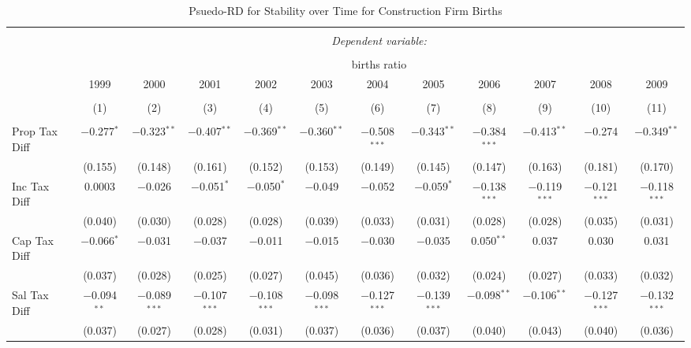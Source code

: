 
\begin{table}[!htbp] \centering 
  \caption{Psuedo-RD for Stability over Time for  Construction Firm Births} 
  \label{23year} 
\small 
\begin{tabular}{@{\extracolsep{5pt}}lccccccccccc} 
\\[-1.8ex]\hline 
\hline \\[-1.8ex] 
 & \multicolumn{11}{c}{\textit{Dependent variable:}} \\ 
\cline{2-12} 
\\[-1.8ex] & \multicolumn{11}{c}{births ratio} \\ 
 & 1999 & 2000 & 2001 & 2002 & 2003 & 2004 & 2005 & 2006 & 2007 & 2008 & 2009 \\ 
\\[-1.8ex] & (1) & (2) & (3) & (4) & (5) & (6) & (7) & (8) & (9) & (10) & (11)\\ 
\hline \\[-1.8ex] 
 Prop Tax Diff & $-$0.277$^{*}$ & $-$0.323$^{**}$ & $-$0.407$^{**}$ & $-$0.369$^{**}$ & $-$0.360$^{**}$ & $-$0.508$^{***}$ & $-$0.343$^{**}$ & $-$0.384$^{***}$ & $-$0.413$^{**}$ & $-$0.274 & $-$0.349$^{**}$ \\ 
  & (0.155) & (0.148) & (0.161) & (0.152) & (0.153) & (0.149) & (0.145) & (0.147) & (0.163) & (0.181) & (0.170) \\ 
  Inc Tax Diff & 0.0003 & $-$0.026 & $-$0.051$^{*}$ & $-$0.050$^{*}$ & $-$0.049 & $-$0.052 & $-$0.059$^{*}$ & $-$0.138$^{***}$ & $-$0.119$^{***}$ & $-$0.121$^{***}$ & $-$0.118$^{***}$ \\ 
  & (0.040) & (0.030) & (0.028) & (0.028) & (0.039) & (0.033) & (0.031) & (0.028) & (0.028) & (0.035) & (0.031) \\ 
  Cap Tax Diff & $-$0.066$^{*}$ & $-$0.031 & $-$0.037 & $-$0.011 & $-$0.015 & $-$0.030 & $-$0.035 & 0.050$^{**}$ & 0.037 & 0.030 & 0.031 \\ 
  & (0.037) & (0.028) & (0.025) & (0.027) & (0.045) & (0.036) & (0.032) & (0.024) & (0.027) & (0.033) & (0.032) \\ 
  Sal Tax Diff & $-$0.094$^{**}$ & $-$0.089$^{***}$ & $-$0.107$^{***}$ & $-$0.108$^{***}$ & $-$0.098$^{***}$ & $-$0.127$^{***}$ & $-$0.139$^{***}$ & $-$0.098$^{**}$ & $-$0.106$^{**}$ & $-$0.127$^{***}$ & $-$0.132$^{***}$ \\ 
  & (0.037) & (0.027) & (0.028) & (0.031) & (0.037) & (0.036) & (0.037) & (0.040) & (0.043) & (0.040) & (0.036) \\ 

\end{tabular}
\end{table}
